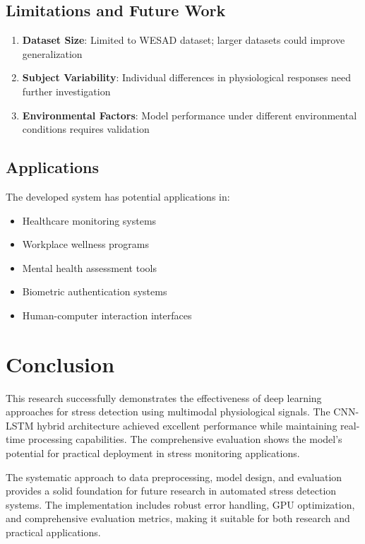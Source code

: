 \documentclass[11pt,a4paper]{article}
\begin{document}
\subsection{Limitations and Future Work}

\begin{enumerate}
    \item \textbf{Dataset Size}: Limited to WESAD dataset; larger datasets could improve generalization
    \item \textbf{Subject Variability}: Individual differences in physiological responses need further investigation
    \item \textbf{Environmental Factors}: Model performance under different environmental conditions requires validation
\end{enumerate}

\subsection{Applications}

The developed system has potential applications in:
\begin{itemize}
    \item Healthcare monitoring systems
    \item Workplace wellness programs
    \item Mental health assessment tools
    \item Biometric authentication systems
    \item Human-computer interaction interfaces
\end{itemize}

\section{Conclusion}

This research successfully demonstrates the effectiveness of deep learning approaches for stress detection using multimodal physiological signals. The CNN-LSTM hybrid architecture achieved excellent performance while maintaining real-time processing capabilities. The comprehensive evaluation shows the model's potential for practical deployment in stress monitoring applications.

The systematic approach to data preprocessing, model design, and evaluation provides a solid foundation for future research in automated stress detection systems. The implementation includes robust error handling, GPU optimization, and comprehensive evaluation metrics, making it suitable for both research and practical applications.
\end{document}
